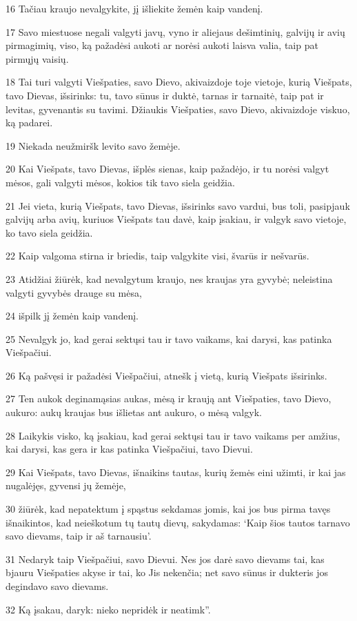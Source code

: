 \par 16 Tačiau kraujo nevalgykite, jį išliekite žemėn kaip vandenį. 
\par 17 Savo miestuose negali valgyti javų, vyno ir aliejaus dešimtinių, galvijų ir avių pirmagimių, viso, ką pažadėsi aukoti ar norėsi aukoti laisva valia, taip pat pirmųjų vaisių. 
\par 18 Tai turi valgyti Viešpaties, savo Dievo, akivaizdoje toje vietoje, kurią Viešpats, tavo Dievas, išsirinks: tu, tavo sūnus ir duktė, tarnas ir tarnaitė, taip pat ir levitas, gyvenantis su tavimi. Džiaukis Viešpaties, savo Dievo, akivaizdoje viskuo, ką padarei. 
\par 19 Niekada neužmiršk levito savo žemėje. 
\par 20 Kai Viešpats, tavo Dievas, išplės sienas, kaip pažadėjo, ir tu norėsi valgyt mėsos, gali valgyti mėsos, kokios tik tavo siela geidžia. 
\par 21 Jei vieta, kurią Viešpats, tavo Dievas, išsirinks savo vardui, bus toli, pasipjauk galvijų arba avių, kuriuos Viešpats tau davė, kaip įsakiau, ir valgyk savo vietoje, ko tavo siela geidžia. 
\par 22 Kaip valgoma stirna ir briedis, taip valgykite visi, švarūs ir nešvarūs. 
\par 23 Atidžiai žiūrėk, kad nevalgytum kraujo, nes kraujas yra gyvybė; neleistina valgyti gyvybės drauge su mėsa, 
\par 24 išpilk jį žemėn kaip vandenį. 
\par 25 Nevalgyk jo, kad gerai sektųsi tau ir tavo vaikams, kai darysi, kas patinka Viešpačiui. 
\par 26 Ką pašvęsi ir pažadėsi Viešpačiui, atnešk į vietą, kurią Viešpats išsirinks. 
\par 27 Ten aukok deginamąsias aukas, mėsą ir kraują ant Viešpaties, tavo Dievo, aukuro: aukų kraujas bus išlietas ant aukuro, o mėsą valgyk. 
\par 28 Laikykis visko, ką įsakiau, kad gerai sektųsi tau ir tavo vaikams per amžius, kai darysi, kas gera ir kas patinka Viešpačiui, tavo Dievui. 
\par 29 Kai Viešpats, tavo Dievas, išnaikins tautas, kurių žemės eini užimti, ir kai jas nugalėjęs, gyvensi jų žemėje, 
\par 30 žiūrėk, kad nepatektum į spąstus sekdamas jomis, kai jos bus pirma tavęs išnaikintos, kad neieškotum tų tautų dievų, sakydamas: ‘Kaip šios tautos tarnavo savo dievams, taip ir aš tarnausiu’. 
\par 31 Nedaryk taip Viešpačiui, savo Dievui. Nes jos darė savo dievams tai, kas bjauru Viešpaties akyse ir tai, ko Jis nekenčia; net savo sūnus ir dukteris jos degindavo savo dievams. 
\par 32 Ką įsakau, daryk: nieko nepridėk ir neatimk”.



